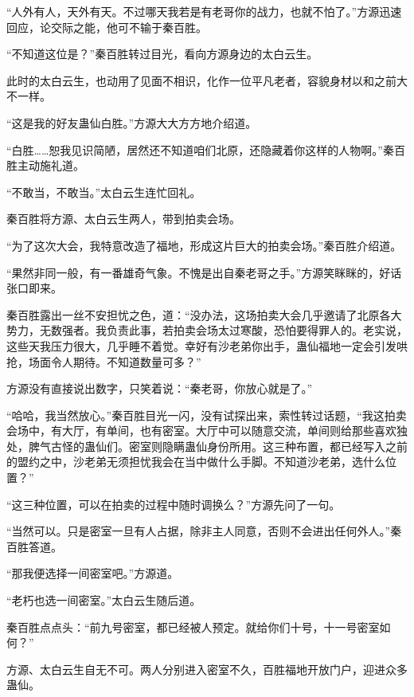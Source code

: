 \begin{this_body}
“人外有人，天外有天。不过哪天我若是有老哥你的战力，也就不怕了。”方源迅速回应，论交际之能，他可不输于秦百胜。

“不知道这位是？”秦百胜转过目光，看向方源身边的太白云生。

此时的太白云生，也动用了见面不相识，化作一位平凡老者，容貌身材以和之前大不一样。

“这是我的好友蛊仙白胜。”方源大大方方地介绍道。

“白胜……恕我见识简陋，居然还不知道咱们北原，还隐藏着你这样的人物啊。”秦百胜主动施礼道。

“不敢当，不敢当。”太白云生连忙回礼。

秦百胜将方源、太白云生两人，带到拍卖会场。

“为了这次大会，我特意改造了福地，形成这片巨大的拍卖会场。”秦百胜介绍道。

“果然非同一般，有一番雄奇气象。不愧是出自秦老哥之手。”方源笑眯眯的，好话张口即来。

秦百胜露出一丝不安担忧之色，道：“没办法，这场拍卖大会几乎邀请了北原各大势力，无数强者。我负责此事，若拍卖会场太过寒酸，恐怕要得罪人的。老实说，这些天我压力很大，几乎睡不着觉。幸好有沙老弟你出手，蛊仙福地一定会引发哄抢，场面令人期待。不知道数量可多？”

方源没有直接说出数字，只笑着说：“秦老哥，你放心就是了。”

“哈哈，我当然放心。”秦百胜目光一闪，没有试探出来，索性转过话题，“我这拍卖会场中，有大厅，有单间，也有密室。大厅中可以随意交流，单间则给那些喜欢独处，脾气古怪的蛊仙们。密室则隐瞒蛊仙身份所用。这三种布置，都已经写入之前的盟约之中，沙老弟无须担忧我会在当中做什么手脚。不知道沙老弟，选什么位置？”

“这三种位置，可以在拍卖的过程中随时调换么？”方源先问了一句。

“当然可以。只是密室一旦有人占据，除非主人同意，否则不会进出任何外人。”秦百胜答道。

“那我便选择一间密室吧。”方源道。

“老朽也选一间密室。”太白云生随后道。

秦百胜点点头：“前九号密室，都已经被人预定。就给你们十号，十一号密室如何？”

方源、太白云生自无不可。两人分别进入密室不久，百胜福地开放门户，迎进众多蛊仙。

\end{this_body}

